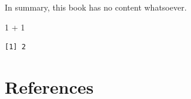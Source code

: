 \documentclass[
  letterpaper,
  DIV=11,
  numbers=noendperiod]{scrreprt}
\newenvironment{Shaded}{\begin{snugshade}}{\end{snugshade}}
\newcommand{\DecValTok}[1]{\textcolor[rgb]{0.68,0.00,0.00}{#1}}
\newcommand{\SpecialCharTok}[1]{\textcolor[rgb]{0.37,0.37,0.37}{#1}}
\newlength{\cslhangindent}
\newlength{\cslentryspacingunit} %
\newenvironment{CSLReferences}[2] %
 {%
  \setlength{\parindent}{0pt}
  \ifodd #1
  \let\oldpar\par
  \def\par{\hangindent=\cslhangindent\oldpar}
  \fi
  \setlength{\parskip}{#2\cslentryspacingunit}
 }%
 {}
\begin{document}
In summary, this book has no content whatsoever.

\begin{Shaded}
\begin{Highlighting}[]
\DecValTok{1} \SpecialCharTok{+} \DecValTok{1}
\end{Highlighting}
\end{Shaded}

\begin{verbatim}
[1] 2
\end{verbatim}


\hypertarget{references}{%
\chapter*{References}\label{references}}

\hypertarget{refs}{}
\begin{CSLReferences}{0}{0}
\end{CSLReferences}
\end{document}
